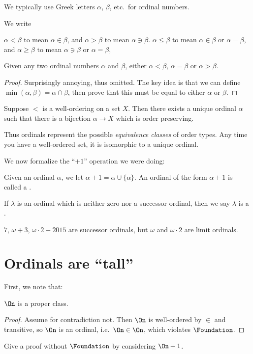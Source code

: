 We typically use Greek letters $\alpha$, $\beta$, etc.\ for ordinal numbers.
\begin{definition}
	We write
	\begin{itemize}
		\ii $\alpha < \beta$ to mean $\alpha \in \beta$,
		and $\alpha > \beta$ to mean $\alpha \ni \beta$.
		\ii $\alpha \le \beta$ to mean $\alpha \in \beta$ or $\alpha = \beta$,
		and $\alpha \ge \beta$ to mean $\alpha \ni \beta$ or $\alpha = \beta$,
	\end{itemize}
\end{definition}

\begin{theorem}
	Given any two ordinal numbers $\alpha$ and $\beta$,
	either $\alpha < \beta$, $\alpha = \beta$ or $\alpha > \beta$.
\end{theorem}
\begin{proof}
	Surprisingly annoying, thus omitted. The key idea is that we can define $\min(\alpha, \beta) =
	\alpha \cap \beta$, then prove that this must be equal to either $\alpha$ or $\beta$.
\end{proof}
\begin{theorem}
	Suppose $<$ is a well-ordering on a set $X$.
	Then there exists a unique ordinal $\alpha$
	such that there is a bijection $\alpha \to X$
	which is order preserving.
\end{theorem}
Thus ordinals represent the possible \emph{equivalence classes} of order types.
Any time you have a well-ordered set, it is isomorphic to a unique ordinal.

We now formalize the ``$+1$'' operation we were doing:
\begin{definition}
	Given an ordinal $\alpha$, we let $\alpha+1 = \alpha \cup \{\alpha\}$.
	An ordinal of the form $\alpha+1$ is called a .
\end{definition}
\begin{definition}
	If $\lambda$ is an ordinal which is neither zero nor a successor ordinal,
	then we say $\lambda$ is a .
\end{definition}
\begin{example}
	$7$, $\omega+3$, $\omega\cdot2+2015$ are successor ordinals,
	but $\omega$ and $\omega \cdot 2$ are limit ordinals.
\end{example}

\section{Ordinals are ``tall''}
First, we note that:
\begin{theorem}
	$\On$ is a proper class.
\end{theorem}
\begin{proof}
	Assume for contradiction not.
	Then $\On$ is well-ordered by $\in$ and transitive, so $\On$ is an ordinal,
	i.e.\ $\On \in \On$, which violates $\Foundation$.
\end{proof}
\begin{exercise}
	[Unimportant] Give a proof without $\Foundation$ by considering $\On+1$.
\end{exercise}

